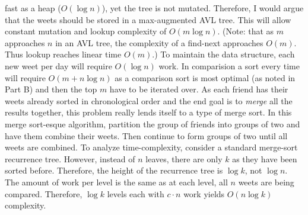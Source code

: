 \documentclass[12pt,twoside]{article}
\begin{document}
\begin{problems}
\begin{problemparts}
    fast as a heap ($O(\log n)$), yet the tree is not mutated. Therefore, I
    would argue that the weets should be stored in a max-augmented AVL tree.
    This will allow constant mutation and lookup complexity of $O(m \log n)$.
    (Note: that as $m$ approaches $n$ in an AVL tree, the complexity of a
    find-next approaches $O(m)$. Thus lookup reaches linear time $O(m)$.) To
    maintain the data structure, each new weet per day will require $O(\log
    n)$ work. In comparision a sort every time will require $O(m + n \log n)$
    as a comparison sort is most optimal (as noted in Part B) and then the
    top $m$ have to be iterated over.
\problempart As each friend has their weets already sorted in chronological
    order and the end goal is to {\it merge} all the results together, this
    problem really lends itself to a type of merge sort. In this merge
    sort-esque algorithm, partition the group of friends into groups of two
    and have them combine their weets. Then continue to form groups of two
    until all weets are combined. To analyze time-complexity, consider a
    standard merge-sort recurrence tree. However, instead of $n$ leaves,
    there are only $k$ as they have been sorted before. Therefore, the height
    of the recurrence tree is $\log k$, not $\log n$. The amount of work per
    level is the same as at each level, all $n$ weets are being compared.
    Therefore, $\log k$ levels each with $c \cdot n$ work yields $O(n \log
    k)$ complexity.
\end{problemparts}

\newpage
\problem  %


\end{problems}
\end{document}
